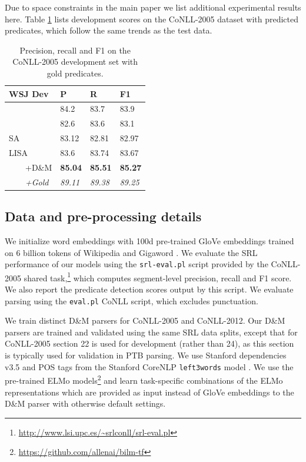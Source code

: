 \documentclass[11pt,a4paper]{article}
\begin{document}
Due to space constraints in the main paper we list additional experimental results here. Table \ref{tab:conll05-gold-pred-dev} lists development scores on the CoNLL-2005 dataset with predicted predicates, which follow the same trends as the test data.

\begin{table}
\begin{tabular}{llll}
WSJ Dev & P & R & F1 \\ \hline \hline
\citet{he2018jointly} & 84.2 & 83.7 & 83.9 \\
\citet{tan2018deep} & 82.6	& 83.6 &	83.1 \\ \hline
SA & 83.12 &	82.81 &	82.97 \\
LISA & 83.6 &	83.74	& 83.67 \\
\ \ \ \ +D\&M & {\bf 85.04} &	{\bf 85.51} &	{\bf 85.27} \\
\ \ \ \ \emph{+Gold} & \emph{89.11} &	\emph{89.38} & 	\emph{89.25}
\end{tabular}
\caption{Precision, recall and F1 on the CoNLL-2005 development set with gold predicates. \label{tab:conll05-gold-pred-dev}}
\end{table}

\subsection{Data and pre-processing details}

We initialize word embeddings with 100d pre-trained GloVe embeddings trained on 6 billion tokens of Wikipedia and Gigaword \citep{pennington2014glove}. We evaluate the SRL performance of our models using the \texttt{srl-eval.pl} script provided by the CoNLL-2005 shared task,\footnote{\protect\url{http://www.lsi.upc.es/~srlconll/srl-eval.pl}} which computes segment-level precision, recall and F1 score. We also report the predicate detection scores output by this script. We evaluate parsing using the \texttt{eval.pl} CoNLL script, which excludes punctuation.

We train distinct D\&M parsers for CoNLL-2005 and CoNLL-2012. Our D\&M parsers are trained and validated using the same SRL data splits, except that for CoNLL-2005 section 22 is used for development (rather than 24), as this section is typically used for validation in PTB parsing. We use Stanford dependencies v3.5 \citep{deMarneffe2008} and POS tags from the Stanford CoreNLP \texttt{left3words} model \citep{toutanova2003feature}. We use the pre-trained ELMo models\footnote{\protect\url{https://github.com/allenai/bilm-tf}} and learn task-specific combinations of the ELMo representations which are provided as input instead of GloVe embeddings to the D\&M parser with otherwise default settings.
\end{document}
